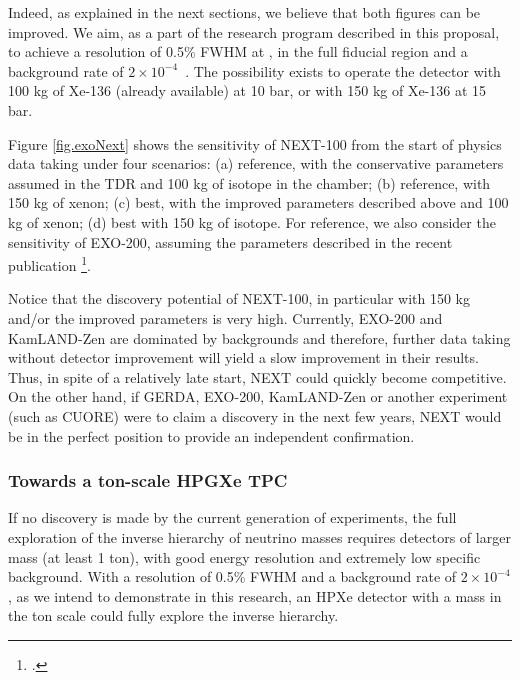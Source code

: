 Indeed, as explained in the next sections, we believe that both figures can be improved. We aim, as a part of the research program described in this proposal, to achieve a resolution of 0.5\% FWHM at \Qbb, in the full fiducial region and a background rate of 
$2 \times 10^{-4}$~\ckky. The possibility exists to operate the detector with 100 kg of Xe-136 (already available) at 10 bar, or with 150 kg of Xe-136 at 15 bar.

Figure \ref{fig.exoNext} shows the sensitivity of NEXT-100 from the start of physics data taking under four scenarios: (a) reference,  with the conservative parameters assumed in the TDR and 100 kg of isotope in the chamber; (b) reference, with 150 kg of xenon; (c)  best, with the improved parameters described above and 100 kg of xenon; (d) best with  150 kg of isotope. For reference, we also consider the sensitivity of EXO-200, assuming the parameters described in the recent publication \footcite{Auger:2012ar}. 

Notice that the discovery potential of NEXT-100, in particular with 150 kg and/or the improved parameters is very high. Currently, EXO-200 and KamLAND-Zen are dominated by backgrounds and therefore, further data taking without detector improvement will yield a slow improvement in their results. Thus, in spite of a relatively late start, NEXT could quickly become competitive.  On the other hand, if GERDA, EXO-200, KamLAND-Zen
or another experiment (such as CUORE) were to claim a discovery in the next few years, NEXT would be in the perfect position to provide an independent confirmation.  

\subsubsection*{Towards a ton-scale HPGXe TPC}


If no discovery is made by the current generation of experiments, the full exploration of the inverse hierarchy of neutrino masses requires detectors of larger mass (at least 1 ton), with good energy resolution and extremely low specific background. With a resolution of 0.5\% FWHM and a background rate of $2 \times 10^{-4}$\ckky, as we intend to demonstrate in this research, an HPXe detector with a mass in the ton scale could fully explore the inverse hierarchy. %


